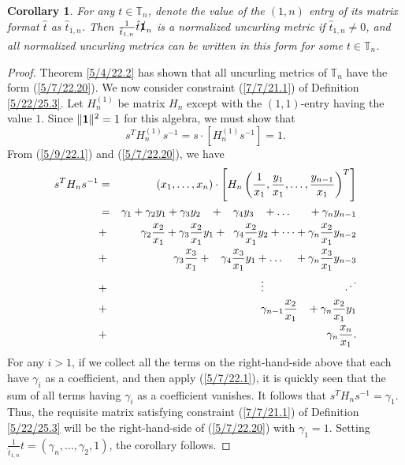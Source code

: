 \documentclass{amsart}
\newtheorem{corollary}[theorem]{Corollary}
\theoremstyle{definition}
\numberwithin{theorem}{section}
\numberwithin{equation}{section}
\begin{document}
\begin{corollary}\label{7/1/22.1} For any $t\in \mathbb{T}_n$, denote the value of the $(1,n)$ entry of its matrix format $\hat{t}$ as $\hat{t}_{1,n}$.  Then $\frac{1}{\hat{t}_{1,n}}\hat{t}\slashed{\bf 1}_n$ is a normalized uncurling metric if $\hat{t}_{1,n}\ne 0$, and all normalized uncurling metrics can be written in this form for some $t\in \mathbb{T}_n$. \end{corollary}
\enlargethispage{1cm}
\begin{proof} Theorem \ref{5/4/22.2} has shown that all uncurling metrics of $\mathbb{T}_n$ have the form (\ref{5/7/22.20}).
We now consider constraint (\ref{7/7/21.1}) of Definition \ref{5/22/25.3}.  Let $H_n^{(1)}$ be matrix $H_n$ except with the  $(1,1)$-entry having the value $1$.  
Since $\|{\bf 1}\|^2 =1$ for this algebra, we must show that \[ s^T H_n^{(1)} s^{-1} = s\cdot [H_n^{(1)}s^{-1}] = 1.\] From (\ref{5/9/22.1}) and (\ref{5/7/22.20}), we have
\begin{eqnarray}\nonumber s^T H_n s^{-1} &=& (x_1,\dots,x_n)\cdot \left[ H_n \left(\frac{1}{x_1}, \frac{y_1}{x_1},\dots,\frac{y_{n-1}}{x_1}\right)^T\right] \\ 
 &=&  \gamma_1 + \gamma_2y_1 + \gamma_3y_2 \hspace{3mm} + \hspace{3mm}\gamma_4y_3 \hspace{3mm} + \dots   \hspace{6mm}+\gamma_ny_{n-1} \nonumber \\
&+&  \gamma_2 \frac{x_2}{x_1} + \gamma_3\frac{x_2}{x_1}y_1 + \hspace{2mm} \gamma_4\frac{x_2}{x_1}y_2 + \dots +  \gamma_n\frac{x_2}{x_1}y_{n-2} \nonumber \\ &+&\gamma_3 \frac{x_3}{x_1}  + \hspace{3mm}\gamma_4\frac{x_3}{x_1}y_1 +  \dots \hspace{4mm} +  \gamma_n\frac{x_3}{x_1}y_{n-3} \nonumber \\ 
&+&  \hspace{5mm} \vdots \hspace{2.5cm} \iddots \bigskip\bigskip \nonumber \\ &+& \gamma_{n-1} \frac{x_2}{x_1} \hspace{3mm} + \gamma_n \frac{x_2}{x_1}y_1 \nonumber \\ &+& \hspace{2mm} \gamma_n\frac{x_n}{x_1}. \label{6/23/22.1}
 \end{eqnarray}
 For any $i>1$, if we collect all the terms on the right-hand-side above that each have $\gamma_i$ as a coefficient, and then apply (\ref{5/7/22.1}), it is quickly seen that the sum of all terms having $\gamma_i$ as a coefficient vanishes.  It follows that
 $s^T H_n s^{-1} =\gamma_1$.   Thus, the requisite matrix satisfying constraint (\ref{7/7/21.1}) of Definition \ref{5/22/25.3} will be the right-hand-side of (\ref{5/7/22.20}) with $\gamma_1=1$.  Setting $\frac{1}{\hat{t}_{1,n}}t = (\gamma_n,\dots,\gamma_2, 1)$, the corollary follows.
\end{proof}
\end{document}
